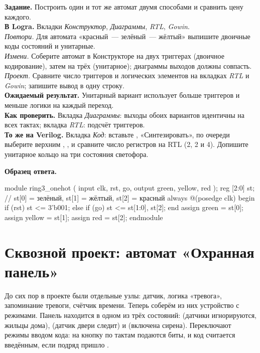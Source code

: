 \begin{diybox}
\textbf{Задание.} Построить один и тот же автомат двумя способами и сравнить
цену каждого.\\
\textbf{В Logra.} Вкладки \emph{Конструктор}, \emph{Диаграммы}, \emph{RTL},
\emph{Gowin}.\\
 \emph{Повтори.} Для автомата «красный~--- зелёный~--- жёлтый»
выпишите двоичные коды состояний и унитарные.\\
 \emph{Измени.} Соберите автомат в Конструкторе на двух триггерах
(двоичное кодирование), затем на трёх (унитарное); диаграммы выходов должны
совпасть.\\
 \emph{Проект.} Сравните число триггеров и логических элементов на
вкладках \emph{RTL} и \emph{Gowin}; запишите вывод в одну строку.\\
\textbf{Ожидаемый результат.} Унитарный вариант использует больше триггеров
и меньше логики на каждый переход.\\
\textbf{Как проверить.} Вкладка \emph{Диаграммы}: выходы обоих вариантов
идентичны на всех тактах; вкладка \emph{RTL}: подсчёт триггеров.\\
\textbf{То же на Verilog.} Вкладка \emph{Код}: вставьте ,
«Синтезировать», по очереди выберите верхним ,
,  и сравните число регистров на RTL (2, 2
и 4).  Допишите унитарное кольцо на три состояния светофора.
\end{diybox}

\textbf{Образец ответа.}
\begin{vcode}
module ring3_onehot (
    input      clk, rst, go,
    output     green, yellow, red
);
    reg [2:0] st;                       // st[0] = зелёный, st[1] = жёлтый, st[2] = красный
    always @(posedge clk) begin
        if (rst)     st <= 3'b001;
        else if (go) st <= {st[1:0], st[2]};
    end
    assign green  = st[0];
    assign yellow = st[1];
    assign red    = st[2];
endmodule
\end{vcode}


\section{Сквозной проект: автомат «Охранная панель»}
\label{sec:panel-fsm}

До сих пор в проекте были отдельные узлы: датчик, логика «тревога», запоминание
тревоги, счётчик времени. Теперь соберём из них устройство с режимами. Панель
находится в одном из трёх состояний:  (датчики
игнорируются, жильцы дома),  (датчик двери следит) и
 (включена сирена). Переключают режимы вводом кода: на кнопку
по тактам подаются биты, и код считается введённым, если подряд пришло
.

